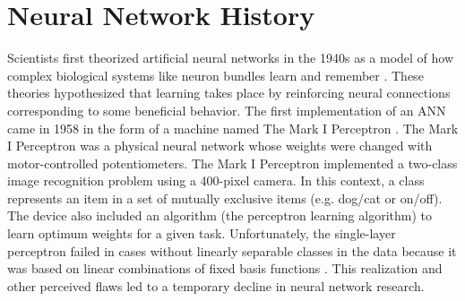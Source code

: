 






\section{Neural Network History}


Scientists first theorized artificial neural networks in the 1940s as a model of how complex biological systems like neuron bundles learn and remember \cite{Pitts1943, Hebb1949}. These theories hypothesized that learning takes place by reinforcing neural connections corresponding to some beneficial behavior. The first implementation of an ANN came in 1958 in the form of a machine named The Mark I Perceptron \cite{Rosenblatt1958, Rosenblatt1962}. The Mark I Perceptron was a physical neural network whose weights were changed with motor-controlled potentiometers. The Mark I Perceptron implemented a two-class image recognition problem using a 400-pixel camera. In this context, a class represents an item in a set of mutually exclusive items (e.g. dog/cat or on/off). The device also included an algorithm (the perceptron learning algorithm) to learn optimum weights for a given task. Unfortunately, the single-layer perceptron failed in cases without linearly separable classes in the data because it was based on linear combinations of fixed basis functions \cite{Bishop2006, Minsky1969}. This realization and other perceived flaws led to a temporary decline in neural network research.



